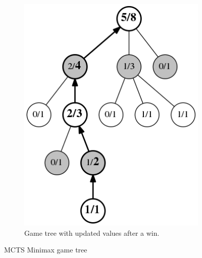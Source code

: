 \documentclass[
11pt, %
english, %
singlespacing, %
headsepline, %
]{MastersDoctoralThesis} %
\begin{document}
\begin{figure}[t]
\begin{subfigure}{0.3\textwidth}
		\includegraphics[width=\textwidth]{images/gametree-values-updated}
		\caption{Game tree with updated values after a win.}
		\label{fig:mcts-gametree-values-updated}
	\end{subfigure}
	\caption{MCTS Minimax game tree}
\end{figure}
\end{document}
